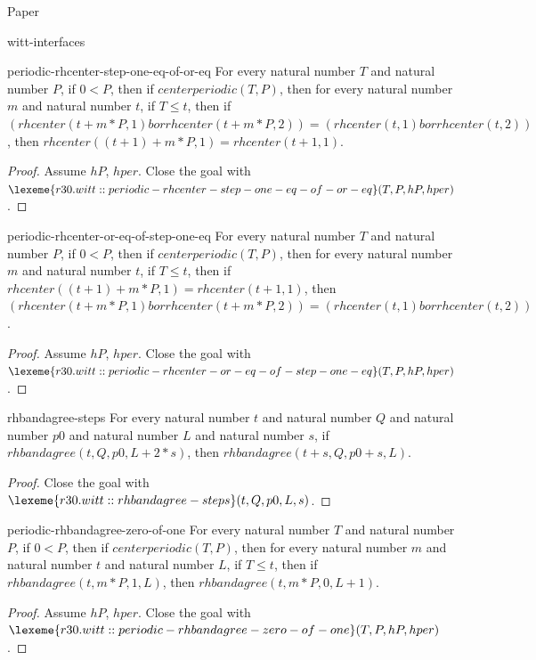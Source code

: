 \begin{lexlean}{Paper}
\begin{section}{witt-interfaces}
  \begin{theorem}{periodic-rhcenter-step-one-eq-of-or-eq}
  For every natural number \(T\) and natural number \(P\), if \(0 < P\), then if \(centerperiodic(T, P)\), then for every natural number \(m\) and natural number \(t\), if \(T ≤ t\), then if \((rhcenter(t + m * P, 1) bor rhcenter(t + m * P, 2)) = (rhcenter(t, 1) bor rhcenter(t, 2))\), then \(rhcenter((t + 1) + m * P, 1) = rhcenter(t + 1, 1)\).
  \begin{proof}
  Assume \(hP\), \(hper\).
  Close the goal with \(\lexeme{r30.witt::periodic-rhcenter-step-one-eq-of-or-eq}(T, P, hP, hper)\).
  \end{proof}
  \end{theorem}

  \begin{theorem}{periodic-rhcenter-or-eq-of-step-one-eq}
  For every natural number \(T\) and natural number \(P\), if \(0 < P\), then if \(centerperiodic(T, P)\), then for every natural number \(m\) and natural number \(t\), if \(T ≤ t\), then if \(rhcenter((t + 1) + m * P, 1) = rhcenter(t + 1, 1)\), then \((rhcenter(t + m * P, 1) bor rhcenter(t + m * P, 2)) = (rhcenter(t, 1) bor rhcenter(t, 2))\).
  \begin{proof}
  Assume \(hP\), \(hper\).
  Close the goal with \(\lexeme{r30.witt::periodic-rhcenter-or-eq-of-step-one-eq}(T, P, hP, hper)\).
  \end{proof}
  \end{theorem}

  \begin{theorem}{rhbandagree-steps}
  For every natural number \(t\) and natural number \(Q\) and natural number \(p0\) and natural number \(L\) and natural number \(s\), if \(rhbandagree(t, Q, p0, L + 2 * s)\), then \(rhbandagree(t + s, Q, p0 + s, L)\).
  \begin{proof}
  Close the goal with \(\lexeme{r30.witt::rhbandagree-steps}(t, Q, p0, L, s)\).
  \end{proof}
  \end{theorem}

  \begin{theorem}{periodic-rhbandagree-zero-of-one}
  For every natural number \(T\) and natural number \(P\), if \(0 < P\), then if \(centerperiodic(T, P)\), then for every natural number \(m\) and natural number \(t\) and natural number \(L\), if \(T ≤ t\), then if \(rhbandagree(t, m * P, 1, L)\), then \(rhbandagree(t, m * P, 0, L + 1)\).
  \begin{proof}
  Assume \(hP\), \(hper\).
  Close the goal with \(\lexeme{r30.witt::periodic-rhbandagree-zero-of-one}(T, P, hP, hper)\).
  \end{proof}
  \end{theorem}


\end{section}
\end{lexlean}
